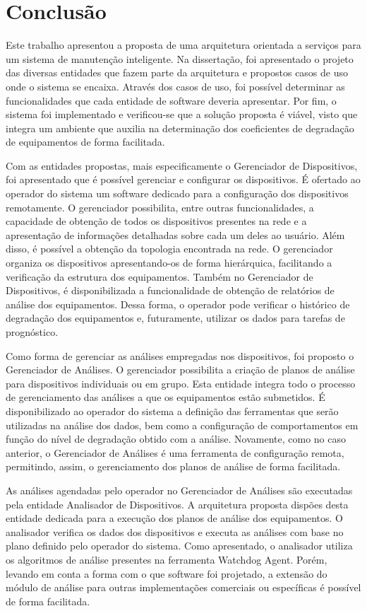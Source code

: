 \chapter{Conclusão}
\label{cha:conclusao}

Este trabalho apresentou a proposta de uma arquitetura orientada a serviços para um sistema de
manutenção inteligente. Na dissertação, foi apresentado o projeto das diversas entidades que fazem
parte da arquitetura e propostos casos de uso onde o sistema se encaixa. Através dos casos de uso,
foi possível determinar as funcionalidades que cada entidade de software deveria apresentar. Por
fim, o sistema foi implementado e verificou-se que a solução proposta é viável, visto que integra um
ambiente que auxilia na determinação dos coeficientes de degradação de equipamentos de forma
facilitada.

Com as entidades propostas, mais especificamente o Gerenciador de Dispositivos, foi apresentado que
é possível gerenciar e configurar os dispositivos. É ofertado ao operador do sistema um software
dedicado para a configuração dos dispositivos remotamente. O gerenciador possibilita, entre outras
funcionalidades, a capacidade de obtenção de todos os dispositivos presentes na rede e a
apresentação de informações detalhadas sobre cada um deles ao usuário. Além disso, é possível a
obtenção da topologia encontrada na rede. O gerenciador organiza os dispositivos apresentando-os de
forma hierárquica, facilitando a verificação da estrutura dos equipamentos. Também no Gerenciador de
Dispositivos, é disponibilizada a funcionalidade de obtenção de relatórios de análise dos
equipamentos. Dessa forma, o operador pode verificar o histórico de degradação dos equipamentos e,
futuramente, utilizar os dados para tarefas de prognóstico.

Como forma de gerenciar as análises empregadas nos dispositivos, foi proposto o Gerenciador de
Análises. O gerenciador possibilita a criação de planos de análise para dispositivos individuais ou
em grupo. Esta entidade integra todo o processo de gerenciamento das análises a que os equipamentos
estão submetidos. É disponibilizado ao operador do sistema a definição das ferramentas que serão
utilizadas na análise dos dados, bem como a configuração de comportamentos em função do nível de
degradação obtido com a análise. Novamente, como no caso anterior, o Gerenciador de Análises é uma
ferramenta de configuração remota, permitindo, assim, o gerenciamento dos planos de análise de forma
facilitada.

As análises agendadas pelo operador no Gerenciador de Análises são executadas pela entidade
Analisador de Dispositivos. A arquitetura proposta dispões desta entidade dedicada para a execução
dos planos de análise dos equipamentos. O analisador verifica os dados dos dispositivos e executa as
análises com base no plano definido pelo operador do sistema. Como apresentado, o analisador utiliza
os algoritmos de análise presentes na ferramenta Watchdog Agent. Porém, levando em conta a forma com
o que software foi projetado, a extensão do módulo de análise para outras implementações comerciais
ou específicas é possível de forma facilitada.

